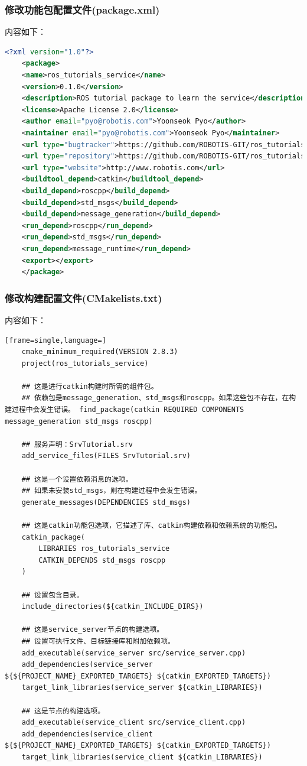\documentclass[geye,green,kindle,cn]{elegantnote}
\begin{document}
\subsubsection{修改功能包配置文件(package.xml)}
内容如下：
\begin{lstlisting}[frame=single,language=xml]
    <?xml version="1.0"?> 
    <package>  
    <name>ros_tutorials_service</name>  
    <version>0.1.0</version>  
    <description>ROS tutorial package to learn the service</description>  
    <license>Apache License 2.0</license>  
    <author email="pyo@robotis.com">Yoonseok Pyo</author>  
    <maintainer email="pyo@robotis.com">Yoonseok Pyo</maintainer>  
    <url type="bugtracker">https://github.com/ROBOTIS-GIT/ros_tutorials/issues</url>  
    <url type="repository">https://github.com/ROBOTIS-GIT/ros_tutorials.git</url>  
    <url type="website">http://www.robotis.com</url>  
    <buildtool_depend>catkin</buildtool_depend>  
    <build_depend>roscpp</build_depend>  
    <build_depend>std_msgs</build_depend>  
    <build_depend>message_generation</build_depend>  
    <run_depend>roscpp</run_depend>  
    <run_depend>std_msgs</run_depend>  
    <run_depend>message_runtime</run_depend>  
    <export></export> 
    </package>
\end{lstlisting}
\subsubsection{修改构建配置文件(CMakelists.txt)}
内容如下：
\begin{lstlisting}[frame=single,language=]
    cmake_minimum_required(VERSION 2.8.3) 
    project(ros_tutorials_service) 
    
    ## 这是进行catkin构建时所需的组件包。 
    ## 依赖包是message_generation、std_msgs和roscpp。如果这些包不存在，在构建过程中会发生错误。 find_package(catkin REQUIRED COMPONENTS message_generation std_msgs roscpp) 
    
    ## 服务声明：SrvTutorial.srv 
    add_service_files(FILES SrvTutorial.srv) 
    
    ## 这是一个设置依赖消息的选项。 
    ## 如果未安装std_msgs，则在构建过程中会发生错误。 
    generate_messages(DEPENDENCIES std_msgs) 
    
    ## 这是catkin功能包选项，它描述了库、catkin构建依赖和依赖系统的功能包。 
    catkin_package(      
        LIBRARIES ros_tutorials_service    
        CATKIN_DEPENDS std_msgs roscpp 
    )
    
    ## 设置包含目录。 
    include_directories(${catkin_INCLUDE_DIRS}) 
    
    ## 这是service_server节点的构建选项。 
    ## 设置可执行文件、目标链接库和附加依赖项。 
    add_executable(service_server src/service_server.cpp) 
    add_dependencies(service_server ${${PROJECT_NAME}_EXPORTED_TARGETS} ${catkin_EXPORTED_TARGETS}) 
    target_link_libraries(service_server ${catkin_LIBRARIES}) 
    
    ## 这是节点的构建选项。 
    add_executable(service_client src/service_client.cpp) 
    add_dependencies(service_client ${${PROJECT_NAME}_EXPORTED_TARGETS} ${catkin_EXPORTED_TARGETS}) 
    target_link_libraries(service_client ${catkin_LIBRARIES})
\end{lstlisting}
\end{document}
